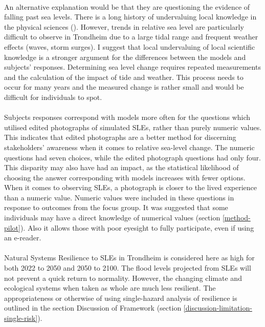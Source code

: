 \paragraph{}
An alternative explanation would be that they are questioning the evidence of falling past sea levels. There is a long history of undervaluing local knowledge in the physical sciences (\cite{setten_we_2019}). However, trends in relative sea level are particularly difficult to observe in Trondheim due to a large tidal range and frequent weather effects (waves, storm surges). I suggest that local undervaluing of local scientific knowledge is a stronger argument for the differences between the models and subjects' responses. Determining sea level change requires repeated measurements and the calculation of the impact of tide and weather. This process needs to occur for many years and the measured change is rather small and would be difficult for individuals to spot. 

\paragraph{}
Subjects responses correspond with models more often for the questions which utilised edited photographs of simulated SLEs, rather than purely numeric values. This indicates that edited photographs are a better method for discerning stakeholders' awareness when it comes to relative sea-level change. The numeric questions had seven choices, while the edited photograph questions had only four. This disparity may also have had an impact, as the statistical likelihood of choosing the answer corresponding with \cite{kartverket_se_2021} models increases with fewer options. When it comes to  observing SLEs, a photograph is closer to the lived experience than a numeric value. Numeric values were included in these questions in response to outcomes from the focus group. It was suggested that some individuals may have a direct knowledge of numerical values (section \ref{method-pilot}). Also it allows those with poor eyesight to fully participate, even if using an e-reader.
\paragraph{}
Natural Systems Resilience to SLEs in Trondheim is considered here as high for both 2022 to 2050 and 2050 to 2100. The flood levels projected from SLEs will not prevent a quick return to normality. However, the changing climate and ecological systems when taken as whole are much less resilient. The appropriateness or otherwise of using single-hazard analysis of resilience is outlined in the section Discussion of Framework (section \ref{discussion-limitation-single-risk}).


